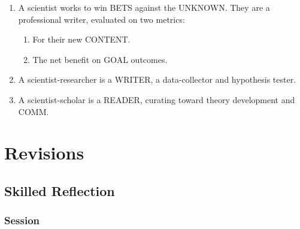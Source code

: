 \documentclass[
]{book}
\providecommand{\tightlist}{%
  \setlength{\itemsep}{0pt}\setlength{\parskip}{0pt}}
\begin{document}
\begin{enumerate}
\def\labelenumi{\arabic{enumi}.}
\setcounter{enumi}{46}
\item
  A scientist works to win BETS against the UNKNOWN. They are a
  professional writer, evaluated on two metrics:

  \begin{enumerate}
  \def\labelenumii{\arabic{enumii}.}
  \tightlist
  \item
    For their new CONTENT.
  \item
    The net benefit on GOAL outcomes.
  \end{enumerate}
\item
  A scientist-researcher is a WRITER, a data-collector and hypothesis tester.
\item
  A scientist-scholar is a READER, curating toward theory development and COMM.
\end{enumerate}

\hypertarget{revisions}{%
\chapter{Revisions}\label{revisions}}

\hypertarget{skilled-reflection}{%
\section{Skilled Reflection}\label{skilled-reflection}}

\hypertarget{session}{%
\subsection{Session}\label{session}}
\end{document}
